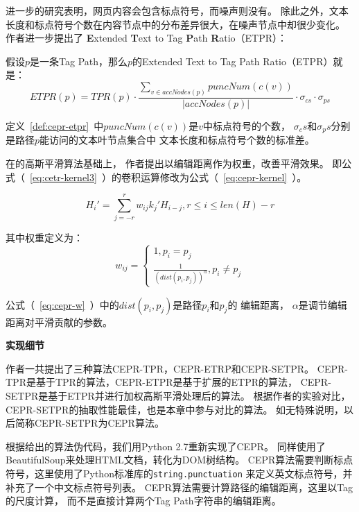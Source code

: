 进一步的研究表明，网页内容会包含标点符号，而噪声则没有。
除此之外，文本长度和标点符号个数在内容节点中的分布差异很大，在噪声节点中却很少变化。
作者进一步提出了
\textbf{E}xtended \textbf{T}ext to Tag \textbf{P}ath \textbf{R}atio（ETPR）：

\begin{definition}
\label{def:cepr-etpr}
假设$p$是一条Tag Path，那么$p$的Extended Text to Tag Path Ratio（ETPR）就是：
\begin{equation}
ETPR(p) = TPR(p) \cdot 
\frac{\sum_{v \in accNodes(p)}puncNum(c(v))}{\vert accNodes(p) \vert}
\cdot \sigma_{cs} \cdot \sigma_{ps}
\end{equation}
\end{definition}

定义~\ref{def:cepr-etpr}~中$puncNum(c(v))$是$v$中标点符号的个数，
$\sigma_cs$和$\sigma_ps$分别是路径$p$能访问的文本叶节点集合中
文本长度和标点符号个数的标准差。

在\cite{weninger2010cetr}的高斯平滑算法基础上，
作者提出以编辑距离作为权重，改善平滑效果。
即公式（~\ref{eq:cetr-kernel3}~）的卷积运算修改为公式（~\ref{eq:cepr-kernel}~）。

\begin{equation}
\label{eq:cepr-kernel}
H_i' = \sum_{j=-r}^{r} w_{ij} k_j' H_{i-j}, r \leq i \leq len(H)-r
\end{equation}

其中权重定义为：
\begin{equation}
\label{eq:cepr-w}
w_{ij} = 
\left\{\begin{matrix}
1, p_i = p_j \\ 
\frac{1}{(dist(p_i, p_j))^\alpha}, p_i \neq p_j
\end{matrix}\right.
\end{equation}

公式（~\ref{eq:cepr-w}~）中的$dist(p_i, p_j)$是路径$p_i$和$p_j$的
编辑距离，
$\alpha$是调节编辑距离对平滑贡献的参数。

\textbf{实现细节}

作者一共提出了三种算法CEPR-TPR，CEPR-ETRP和CEPR-SETPR。
CEPR-TPR是基于TPR的算法，CEPR-ETPR是基于扩展的ETPR的算法，
CEPR-SETPR是基于ETPR并进行加权高斯平滑处理后的算法。
根据作者的实验对比，CEPR-SETPR的抽取性能最佳，也是本章中参与对比的算法。
如无特殊说明，以后简称CEPR-SETPR为CEPR算法。

根据\cite{wu2013web}给出的算法伪代码，我们用Python 2.7重新实现了CEPR。
同样使用了BeautifulSoup来处理HTML文档，转化为DOM树结构。
CEPR算法需要判断标点符号，这里使用了Python标准库的\texttt{string.punctuation}
来定义英文标点符号，并补充了一个中文标点符号列表。
CEPR算法需要计算路径的编辑距离，这里以Tag的尺度计算，
而不是直接计算两个Tag Path字符串的编辑距离。

